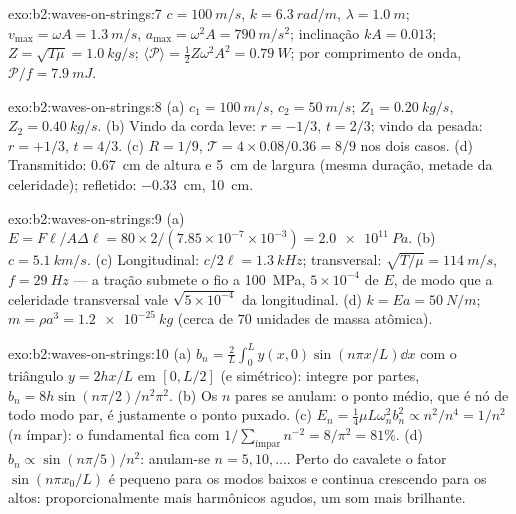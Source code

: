 \begin{solution}{exo:b2:waves-on-strings:7}
$c = \qty{100}{m/s}$, $k = \qty{6.3}{rad/m}$, $\lambda = \qty{1.0}{m}$; $v_{\max} = \omega A =
\qty{1.3}{m/s}$, $a_{\max} = \omega^2A = \qty{790}{m/s^2}$; inclinação $kA = 0.013$; $Z =
\sqrt{T\mu} = \qty{1.0}{kg/s}$; $\langle\mathcal P\rangle = \tfrac12Z\omega^2A^2 = \qty{0.79}{W}$;
por comprimento de onda, $\mathcal P/f = \qty{7.9}{mJ}$.
\end{solution}

\begin{solution}{exo:b2:waves-on-strings:8}
(a) $c_1 = \qty{100}{m/s}$, $c_2 = \qty{50}{m/s}$; $Z_1 = \qty{0.20}{kg/s}$, $Z_2 = \qty{0.40}{kg/s}$.
(b) Vindo da corda leve: $r = -1/3$, $t = 2/3$; vindo da pesada: $r =
+1/3$, $t = 4/3$. (c) $R = 1/9$, $\mathcal T = 4 \times 0.08/0.36 = 8/9$ nos dois casos.
(d) Transmitido: \qty{0.67}{cm} de altura e \qty{5}{cm} de largura (mesma duração, metade
da celeridade); refletido: \qty{-0.33}{cm}, \qty{10}{cm}.
\end{solution}

\begin{solution}{exo:b2:waves-on-strings:9}
(a) $E = F\ell/A\Delta\ell = 80 \times 2/(7.85 \times 10^{-7} \times 10^{-3}) = \qty{2.0e11}{Pa}$.
(b) $c = \qty{5.1}{km/s}$. (c) Longitudinal: $c/2\ell = \qty{1.3}{kHz}$; transversal:
$\sqrt{T/\mu} = \qty{114}{m/s}$, $f = \qty{29}{Hz}$ --- a tração submete o
fio a \qty{100}{MPa}, $5 \times 10^{-4}$ de $E$, de modo que a celeridade transversal vale
$\sqrt{5 \times 10^{-4}}$ da longitudinal. (d) $k = Ea = \qty{50}{N/m}$; $m
= \rho a^3 = \qty{1.2e-25}{kg}$ (cerca de $70$ unidades de massa atômica).
\end{solution}

\begin{solution}{exo:b2:waves-on-strings:10}
(a) $b_n = \frac2L\int_0^Ly(x, 0)\sin(n\pi x/L)\dd x$ com o triângulo $y =
2hx/L$ em $[0, L/2]$ (e simétrico): integre por partes, $b_n = 8h\sin(n\pi/2)
/n^2\pi^2$. (b) Os $n$ pares se anulam: o ponto médio, que é nó de todo modo par,
é justamente o ponto puxado. (c) $E_n = \tfrac14\mu L\omega_n^2b_n^2 \propto n^2/n^4 = 1/n^2$
($n$ ímpar): o fundamental fica com $1/\sum_{\text{ímpar}}n^{-2} = 8/\pi^2 = 81\%$. (d)
$b_n \propto \sin(n\pi/5)/n^2$: anulam-se $n = 5, 10, \dots$. Perto do cavalete o
fator $\sin(n\pi x_0/L)$ é pequeno para os modos baixos e continua crescendo
para os altos: proporcionalmente mais harmônicos agudos, um som mais brilhante.
\end{solution}

